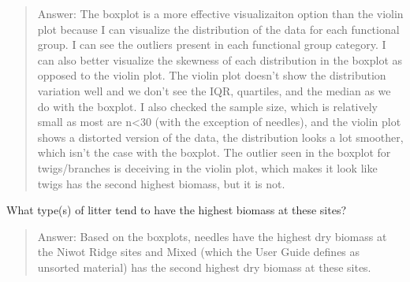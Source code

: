 \documentclass[
]{article}
\begin{document}
\begin{quote}
Answer: The boxplot is a more effective visualizaiton option than the
violin plot because I can visualize the distribution of the data for
each functional group. I can see the outliers present in each functional
group category. I can also better visualize the skewness of each
distribution in the boxplot as opposed to the violin plot. The violin
plot doesn't show the distribution variation well and we don't see the
IQR, quartiles, and the median as we do with the boxplot. I also checked
the sample size, which is relatively small as most are n\textless30
(with the exception of needles), and the violin plot shows a distorted
version of the data, the distribution looks a lot smoother, which isn't
the case with the boxplot. The outlier seen in the boxplot for
twigs/branches is deceiving in the violin plot, which makes it look like
twigs has the second highest biomass, but it is not.
\end{quote}

What type(s) of litter tend to have the highest biomass at these sites?

\begin{quote}
Answer: Based on the boxplots, needles have the highest dry biomass at
the Niwot Ridge sites and Mixed (which the User Guide defines as
unsorted material) has the second highest dry biomass at these sites.
\end{quote}
\end{document}

